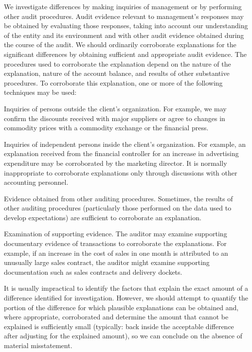 We investigate differences by making inquiries of management or by performing other audit procedures. Audit evidence relevant to management's responses may be obtained by evaluating those responses, taking into account our understanding of the entity and its environment and with other audit evidence obtained during the course of the audit. We should ordinarily corroborate explanations for the significant differences by obtaining sufficient and appropriate audit evidence. The procedures used to corroborate the explanation depend on the nature of the explanation, nature of the account balance, and results of other substantive procedures. To corroborate this explanation, one or more of the following techniques may be used:
\begin{compactitem}
\item Inquiries of persons outside the client's organization. For example, we may confirm the discounts received with major suppliers or agree to changes in commodity prices with a commodity exchange or the financial press.
\item Inquiries of independent persons inside the client's organization. For example, an explanation received from the financial controller for an increase in advertising expenditure may be corroborated by the marketing director. It is normally inappropriate to corroborate ex\-pla\-nations only through discussions with other accounting personnel.
\item Evidence obtained from other auditing procedures. Sometimes, the results of other auditing procedures (particularly those performed on the data used to develop expectations) are sufficient to corroborate an explanation.
\item Examination of supporting evidence. The auditor may examine supporting documentary evidence of transactions to corroborate the explanations. For example, if an increase in the cost of sales in one month is attributed to an unusually large sales contract, the auditor might examine supporting documentation such as sales contracts and delivery dockets.
\end{compactitem}

\bigskip
It is usually impractical to identify the factors that explain the exact amount of a difference identified for investigation. However, we should attempt to quantify the portion of the difference for which plausible explanations can be obtained and, where appropriate, corroborated and determine the amount that cannot be explained is sufficiently small (typically: back inside the acceptable difference after adjusting for the explained amount), so we can conclude on the absence of material misstatement.


